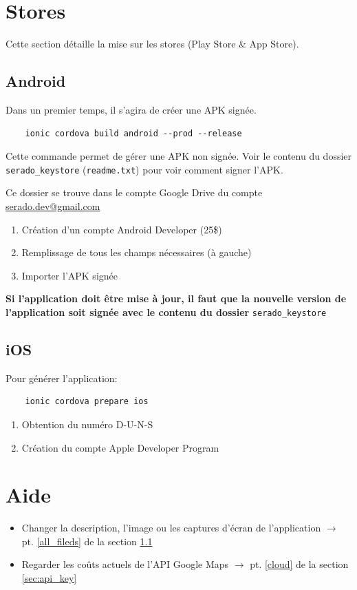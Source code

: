 \documentclass[french]{report}
\begin{document}
\section{Stores}
Cette section détaille la mise sur les stores (Play Store \& App Store).

\subsection{Android} \label{sec:android}
Dans un premier temps, il s'agira de créer une APK signée.
\begin{verbatim}
    ionic cordova build android --prod --release
\end{verbatim}
Cette commande permet de gérer une APK non signée. Voir le contenu du dossier
\verb|serado_keystore| (\verb|readme.txt|) pour voir comment signer l'APK.

Ce dossier se trouve dans le compte Google Drive du compte
\url{serado.dev@gmail.com}

\begin{enumerate}
    \item Création d'un compte Android Developer (25\$)
    \item Remplissage de tous les champs nécessaires (à gauche)\label{all_fileds}
    \item Importer l'APK signée
\end{enumerate}

\textbf{Si l'application doit être mise à jour, il faut que la nouvelle version de
l'application soit signée avec le contenu du dossier} \verb|serado_keystore|

\subsection{iOS}
Pour générer l'application:
\begin{verbatim}
    ionic cordova prepare ios
\end{verbatim}

\begin{enumerate}
    \item Obtention du numéro D-U-N-S
    \item Création du compte Apple Developer Program
\end{enumerate}

\section{Aide}

\begin{itemize}
    \item Changer la description, l'image ou les captures d'écran de l'application
    $\rightarrow$ pt. \ref{all_fileds} de la section \ref{sec:android}
    \item Regarder les coûts actuels de l'API Google Maps $\rightarrow$ pt. \ref{cloud} de la section \ref{sec:api_key}
\end{itemize}
\end{document}
